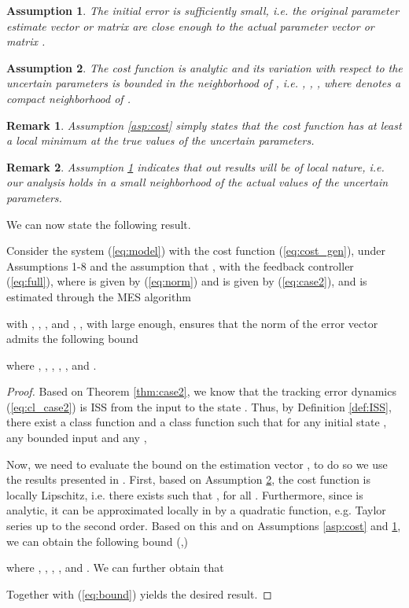 \documentclass[twoside,leqno,onecolumn]{article}
\newtheorem{assumption}{Assumption}
\newtheorem{remark}{Remark}
\begin{document}
\begin{assumption}
\label{asp:local}
The initial error  is sufficiently small, i.e. the original parameter estimate vector or matrix  are close enough to the actual parameter vector or matrix .
\end{assumption}

\begin{assumption}
\label{asp:Lips}
The cost function  is analytic and its variation with respect to the uncertain parameters is bounded in the neighborhood of , i.e. , ,
, where  denotes a compact neighborhood of .
\end{assumption}

\begin{remark}
Assumption \ref{asp:cost} simply states that the cost function  has at least a local minimum at the true values of the uncertain parameters.
\end{remark}

\begin{remark}
Assumption \ref{asp:local} indicates that out results will be of local nature, i.e. our analysis holds in a small neighborhood of the actual values of the uncertain parameters.
\end{remark}

We can now state the following result.
\begin{lemma}
\label{lem:case1} Consider the system (\ref{eq:model}) with the
cost function (\ref{eq:cost_gen}), under Assumptions 1-8 and the
assumption that ,
with the feedback controller (\ref{eq:full}), where  is given
by (\ref{eq:norm}) and  is given by (\ref{eq:case2}), and
 is estimated through the MES algorithm

with , ,
, and , , with  large enough, ensures that
the norm of the error vector  admits the following bound

where , , , , ,  and .
\end{lemma}

\begin{proof}
Based on Theorem \ref{thm:case2}, we know that the tracking error
dynamics (\ref{eq:cl_case2}) is ISS from the input 
to the state . Thus, by Definition \ref{def:ISS}, there
exist a class  function  and a class
 function  such that for any initial state
, any bounded input  and any ,

Now, we need to evaluate the bound on the estimation vector
, to do so we use the results presented in
\cite{Rote00}. First, based on Assumption \ref{asp:Lips}, the cost
function is locally Lipschitz, i.e. there exists  such
that ,
for all .
Furthermore, since  is analytic, it can be approximated locally
in  by a quadratic function, e.g.
Taylor series up to the second order. Based on this and on
Assumptions \ref{asp:cost} and \ref{asp:local}, we can obtain the
following bound (\cite[p. 436-437]{Rote00},\cite{BA13})

where , , ,
, and . We can further obtain that

Together with (\ref{eq:bound}) yields the desired result.
\end{proof}
\end{document}
